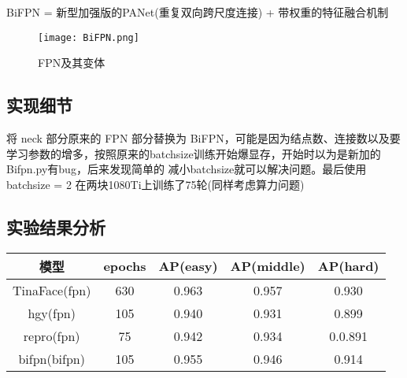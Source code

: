 \documentclass[10pt,a4paper]{article}%
\begin{document}
	BiFPN = 新型加强版的PANet(重复双向跨尺度连接) + 带权重的特征融合机制
	\begin{figure}[h]%
		\centering
		\begin{minipage}{1\textwidth}%
			\centering
			\texttt{[image: BiFPN.png]}%
			\caption{\fontsize{10pt}{15pt}\selectfont FPN及其变体
		}%
		\end{minipage}
	\end{figure}		

	\subsection{实现细节}
	将 neck 部分原来的 FPN 部分替换为 BiFPN，可能是因为结点数、连接数以及要学习参数的增多，按照原来的batchsize训练开始爆显存，开始时以为是新加的Bifpn.py有bug，后来发现简单的
	减小batchsize就可以解决问题。最后使用batchsize = 2 在两块1080Ti上训练了75轮(同样考虑算力问题)
	\subsection{实验结果分析}
	\begin{center}
		\begin{tabular}{c| c||c|c|c}
			\hline
			模型 & epochs & AP(easy)& AP(middle) & AP(hard)\\
			\hline
			TinaFace(fpn) & 630 & 0.963 & 0.957 &	0.930\\
			\hline
			hgy(fpn) & 105 & 0.940 & 0.931 &	0.899\\
			\hline
			repro(fpn) & 75 & 0.942 & 0.934 &	0.0.891\\
			\hline
			bifpn(bifpn) & 105 & 0.955 & 0.946 &	0.914\\
			\hline
		\end{tabular}
		\end{center}	
\end{document}
